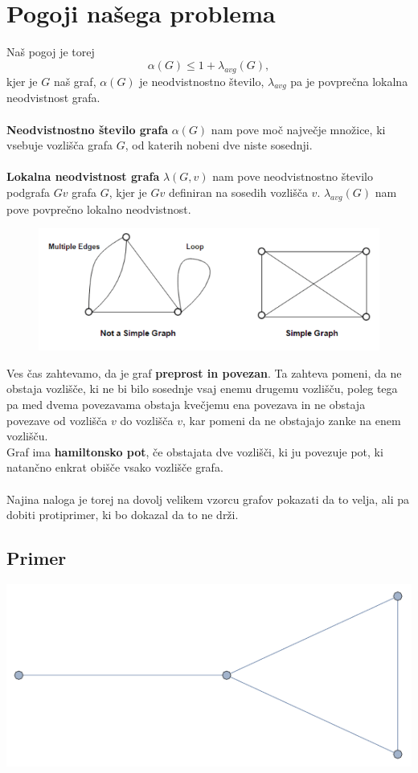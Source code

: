 \documentclass[12pt,a4paper]{amsart}
\theoremstyle{definition} %
\theoremstyle{plain} %
\begin{document}
\section{Pogoji našega problema}
Naš pogoj je torej $$ \alpha(G) \leq 1 + \lambda_{avg}(G),$$
kjer je $G$ naš graf, $\alpha(G)$ je neodvistnostno število, $\lambda_{avg}$ pa je povprečna lokalna neodvistnost grafa.\\
\ \\
\textbf{Neodvistnostno število grafa} $\alpha(G)$ nam pove moč največje množice, ki vsebuje  vozlišča grafa $G$, od katerih nobeni dve niste sosednji.\\
\ \\
\textbf{Lokalna neodvistnost grafa} $\lambda(G, v)$ nam pove neodvistnostno število podgrafa $Gv$ grafa $G$, kjer je $Gv$ definiran na sosedih vozlišča $v$. $\lambda_{avg}(G)$ nam pove povprečno lokalno neodvistnost.\\
\begin{figure}[h]
	\centering

	\includegraphics[scale=1]{slike/graf1}
\end{figure}

Ves čas zahtevamo, da je graf \textbf{preprost in povezan}. Ta zahteva pomeni, da ne obstaja vozlišče, ki ne bi bilo sosednje vsaj enemu drugemu vozlišču, poleg tega pa med dvema povezavama obstaja kvečjemu ena povezava in ne obstaja  povezave od vozlišča $v$ do vozlišča $v$, kar pomeni da ne obstajajo zanke na enem vozlišču.\\
 
Graf ima \textbf{hamiltonsko pot}, če obstajata dve vozlišči, ki ju povezuje pot, ki natančno enkrat obišče vsako vozlišče grafa.\\
\ \\
Najina naloga je torej na dovolj velikem vzorcu grafov pokazati da to velja, ali pa dobiti protiprimer, ki bo dokazal da to ne drži.\\
\subsection{Primer}
\includegraphics{slike/grafek}
\end{document}
